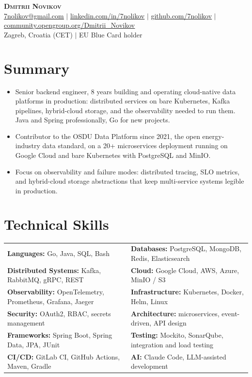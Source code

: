 \documentclass[letterpaper,11pt]{article}
\newcommand{\resumeItem}[1]{
  \item\small{
    \begin{minipage}[t]{0.99\linewidth} %
      {#1}
    \end{minipage}
    \vspace{1pt} %
  }
}
\newcommand{\resumeItemListStart}{\begin{itemize}}
\newcommand{\resumeItemListEnd}{\end{itemize}\vspace{-5pt}}
\begin{document}
\begin{center}
    \textbf{\Huge \scshape Dmitrii Novikov} \\ \vspace{1pt}
    \small \href{mailto:7nolikov@gmail.com}{\underline{7nolikov@gmail.com}} $|$ 
    \href{https://www.linkedin.com/in/7nolikov}{\underline{linkedin.com/in/7nolikov}} $|$
    \href{https://github.com/7nolikov}{\underline{github.com/7nolikov}} $|$
    \href{https://community.opengroup.org/Dmitrii_Novikov}{\underline{community.opengroup.org/Dmitrii\_Novikov}} \\ \vspace{2pt}
    \small Zagreb, Croatia (CET) $|$ EU Blue Card holder
\end{center}


\section{Summary}
    \resumeItemListStart
        \resumeItem{Senior backend engineer, 8 years building and operating cloud-native data platforms in production: distributed services on bare Kubernetes, Kafka pipelines, hybrid-cloud storage, and the observability needed to run them. Java and Spring professionally, Go for new projects.}
        \resumeItem{Contributor to the OSDU Data Platform since 2021, the open energy-industry data standard, on a 20+ microservices deployment running on Google Cloud and bare Kubernetes with PostgreSQL and MinIO.}
        \resumeItem{Focus on observability and failure modes: distributed tracing, SLO metrics, and hybrid-cloud storage abstractions that keep multi-service systems legible in production.}
    \resumeItemListEnd


\section{Technical Skills}
\small{
\begin{tabularx}{\textwidth}{>{\raggedright\arraybackslash}X >{\raggedright\arraybackslash}X}
    \textbf{Languages:} Go, Java, SQL, Bash & \textbf{Databases:} PostgreSQL, MongoDB, Redis, Elasticsearch \\
    \textbf{Distributed Systems:} Kafka, RabbitMQ, gRPC, REST & \textbf{Cloud:} Google Cloud, AWS, Azure, MinIO / S3 \\
    \textbf{Observability:} OpenTelemetry, Prometheus, Grafana, Jaeger & \textbf{Infrastructure:} Kubernetes, Docker, Helm, Linux \\
    \textbf{Security:} OAuth2, RBAC, secrets management & \textbf{Architecture:} microservices, event-driven, API design \\
    \textbf{Frameworks:} Spring Boot, Spring Data, JPA, JUnit & \textbf{Testing:} Mockito, SonarQube, integration and load testing \\
    \textbf{CI/CD:} GitLab CI, GitHub Actions, Maven, Gradle & \textbf{AI:} Claude Code, LLM-assisted development
\end{tabularx}
}
\end{document}
